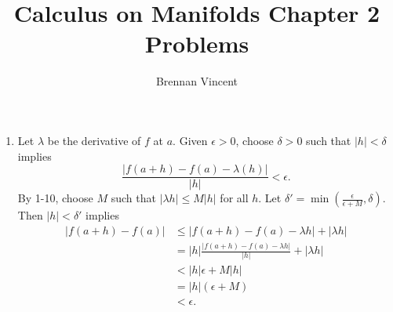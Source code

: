 \documentclass{article}
\title{Calculus on Manifolds Chapter 2 Problems}
\author{Brennan Vincent}
\begin{document}
\maketitle
\begin{enumerate}[label=\textbf{2-\arabic*.}]
\item Let $\lambda$ be the derivative of $f$ at $a$. Given $\epsilon > 0$, choose $\delta>0$ such that $|h|<\delta$ implies \[\frac{|f(a+h)-f(a)-\lambda(h)|}{|h|} < \epsilon.\] By 1-10, choose $M$ such that $|\lambda h| \leq M|h|$ for all $h$. Let $\delta' = \min(\frac{\epsilon}{\epsilon+M},\delta)$. Then $|h| < \delta'$ implies
\begin{align*}
|f(a+h) - f(a)| &\leq |f(a+h) - f(a) - \lambda h| + |\lambda h|\\
	&= |h|\frac{|f(a+h)-f(a)-\lambda h|}{|h|} + |\lambda h|\\
	&< |h|\epsilon + M|h|\\
	&= |h|(\epsilon + M)\\
	&< \epsilon.
\end{align*}
\end{enumerate}
\end{document}
